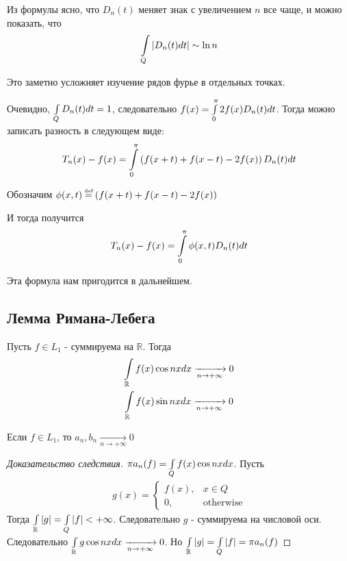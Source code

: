 Из формулы ясно, что $D_n(t)$ меняет знак с увеличением  $n$ все чаще, и можно показать, что 
\begin{gather*}
	\int\limits_{Q} \left|D_n(t) dt\right| \sim \ln n
\end{gather*}

Это заметно усложняет изучение рядов фурье в отдельных точках.

Очевидно, $\int\limits_{Q}D_n(t) dt = 1$, следовательно $f(x) = \int\limits_{0}^{\pi} 2 f(x) D_n(t) dt$.
Тогда можно записать разность в следующем виде:
\begin{gather*}
	T_n(x) - f(x) = \int\limits_{0}^{\pi} \left(f(x + t) + f(x - t) - 2 f(x)\right)D_n(t) dt
\end{gather*}

Обозначим
$\phi(x, t) \defeq \left(f(x + t) + f(x - t) - 2 f(x)\right)$

И тогда получится 
\begin{gather*}
	T_n(x) - f(x) = \int\limits_{0}^{\pi} \phi(x, t) D_n(t) dt
\end{gather*}

Эта формула нам пригодится в дальнейшем.

\subsection{Лемма Римана-Лебега}

\begin{lemma}
	Пусть $f \in L_1$ - суммируема на $\mathbb{R}$. Тогда
	\begin{gather*}
		\int\limits_{\mathbb{R}} f(x) \cos nx dx \xrightarrow[n \rightarrow +\infty]{} 0\\
		\int\limits_{\mathbb{R}}f(x) \sin nx dx  \xrightarrow[n \rightarrow +\infty]{} 0
	\end{gather*}
\end{lemma}

\begin{corollary}
	Если $f \in L_1$, то $a_n, b_n \xrightarrow[n \rightarrow +\infty]{} 0$
\end{corollary}

\begin{proof}[Доказательство следствия]
	$\pi a_n(f) = \int\limits_{Q} f(x)\cos nx dx$. Пусть
	\begin{gather*}
		g(x) = 
		\left\{\begin{matrix}
			f(x), & x\in Q\\
			0,   & \text{otherwise} 
		\end{matrix}\right.
	\end{gather*}
	Тогда $\int\limits_{\mathbb{R}}\left|g\right| = \int\limits_{Q}\left|f\right| <+\infty$. 
	Следовательно $g$ - суммируема на числовой оси. 
	Следовательно $\int\limits_{\mathbb{R}}g \cos nx dx \xrightarrow[n \rightarrow +\infty]{}0$.
	Но $\int\limits_{\mathbb{R}}\left|g\right| = \int\limits_{Q}\left|f\right| = \pi a_n(f)$
\end{proof}

